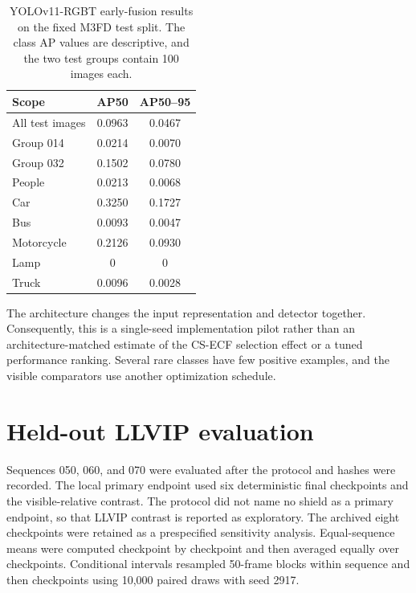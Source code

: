 \documentclass[11pt]{article}
\begin{document}
\begin{table}[h]
\centering
\small
\caption{YOLOv11-RGBT early-fusion results on the fixed M3FD test split. The
class AP values are descriptive, and the two test groups contain 100 images
each.}
\label{tab:supp-joint-baseline}
\begin{tabular}{@{}lcc@{}}
\toprule
Scope & AP50 & AP50--95 \\
\midrule
All test images & 0.0963 & 0.0467 \\
Group 014 & 0.0214 & 0.0070 \\
Group 032 & 0.1502 & 0.0780 \\
People & 0.0213 & 0.0068 \\
Car & 0.3250 & 0.1727 \\
Bus & 0.0093 & 0.0047 \\
Motorcycle & 0.2126 & 0.0930 \\
Lamp & 0 & 0 \\
Truck & 0.0096 & 0.0028 \\
\bottomrule
\end{tabular}
\end{table}

The architecture changes the input representation and detector together.
Consequently, this is a single-seed implementation pilot rather than an
architecture-matched estimate of the CS-ECF selection effect or a tuned
performance ranking. Several rare classes have few positive examples, and the
visible comparators use another optimization schedule.

\section{Held-out LLVIP evaluation}

Sequences 050, 060, and 070 were evaluated after the protocol and hashes were
recorded. The local primary endpoint used six deterministic final checkpoints
and the visible-relative contrast. The protocol did not name no shield as a
primary endpoint, so that LLVIP contrast is reported as exploratory.
The archived eight checkpoints were retained as a prespecified sensitivity
analysis. Equal-sequence means were computed checkpoint by checkpoint and then
averaged equally over checkpoints. Conditional intervals resampled 50-frame
blocks within sequence and then checkpoints using 10,000 paired draws with
seed 2917.
\end{document}
